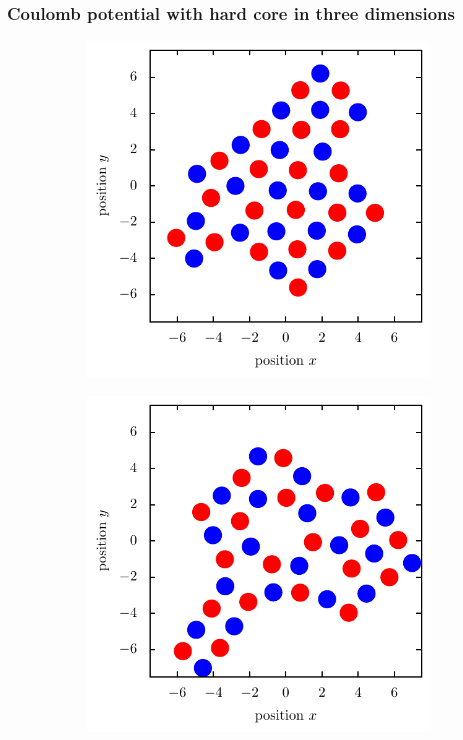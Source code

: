 \documentclass[11pt, a4paper]{article}
\numberwithin{equation}{section}
\begin{document}
\subsubsection{Coulomb potential with hard core in three dimensions} \label{sec:2d_coulomb_vis}
\begin{figure}[hp]
	\begin{subfigure}[t]{0.48\textwidth}
		\centering
		\includegraphics[width=\textwidth]{figures/Kristall_3_beta_500.pdf}
		\label{fig:coulomb_crystal}
		\vspace*{0.3cm}
	\end{subfigure}
	\hfill
	\begin{subfigure}[t]{0.48\textwidth}
		\centering
		\includegraphics[width=\textwidth]{figures/Kristall_4_beta_500.pdf}

\end{subfigure}
\end{figure}
\end{document}
